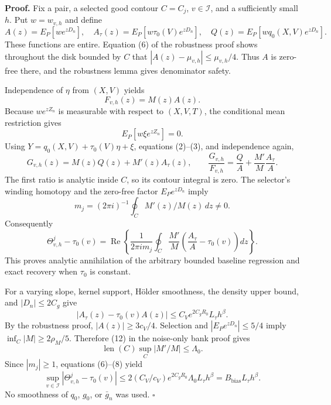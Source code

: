 \textbf{Proof.}
Fix a pair, a selected good contour \(C=C_j\), \(v\in\mathcal I\), and a sufficiently small \(h\). Put \(w=w_{v,h}\) and define
\[
 A(z)=E_P[we^{zD_n}],\quad
 A_\tau(z)=E_P[w\tau_0(V)e^{zD_n}],\quad
 Q(z)=E_P[wq_0(X,V)e^{zD_n}]. \tag{1}
\]
These functions are entire. Equation (6) of the robustness proof shows throughout the disk bounded by \(C\) that \(|A(z)-\mu_{v,h}|\le\mu_{v,h}/4\). Thus \(A\) is zero-free there, and the robustness lemma gives denominator safety.

Independence of \(\eta\) from \((X,V)\) yields
\[
 F_{v,h}(z)=M(z)A(z). \tag{2}
\]
Because \(we^{zZ_n}\) is measurable with respect to \((X,V,T)\), the conditional mean restriction gives
\[
 E_P[w\xi e^{zZ_n}]=0. \tag{3}
\]
Using \(Y=q_0(X,V)+\tau_0(V)\eta+\xi\), equations (2)--(3), and independence again,
\[
 G_{v,h}(z)=M(z)Q(z)+M'(z)A_\tau(z),\qquad
 \frac{G_{v,h}}{F_{v,h}}
 =\frac QA+\frac{M'}M\frac{A_\tau}{A}. \tag{4}
\]
The first ratio is analytic inside \(C\), so its contour integral is zero. The selector's winding homotopy and the zero-free factor \(E_Pe^{zD_n}\) imply
\[
 m_j=(2\pi i)^{-1}\oint_C M'(z)/M(z)\,dz\ne0. \tag{5}
\]
Consequently
\[
 \Theta^j_{v,h}-\tau_0(v)
 =\operatorname{Re}\left\{\frac{1}{2\pi i m_j}
 \oint_C\frac{M'}M
 \left(\frac{A_\tau}{A}-\tau_0(v)\right)dz\right\}. \tag{6}
\]
This proves analytic annihilation of the arbitrary bounded baseline regression and exact recovery when \(\tau_0\) is constant.

For a varying slope, kernel support, H\"older smoothness, the density upper bound, and \(|D_n|\le2C_g\) give
\[
 |A_\tau(z)-\tau_0(v)A(z)|
 \le C_Ve^{2C_gR_0}L_\tau h^\beta. \tag{7}
\]
By the robustness proof, \(|A(z)|\ge3c_V/4\). Selection and \(|E_Pe^{zD_n}|\le5/4\) imply \(\inf_C|M|\ge2\rho_M/5\). Therefore (12) in the noise-only bank proof gives
\[
 \operatorname{len}(C)\sup_C|M'/M|\le\Lambda_0. \tag{8}
\]
Since \(|m_j|\ge1\), equations (6)--(8) yield
\[
 \sup_{v\in\mathcal I}|\Theta^j_{v,h}-\tau_0(v)|
 \le 2(C_V/c_V)e^{2C_gR_0}\Lambda_0L_\tau h^\beta
 =B_{\mathrm{bias}}L_\tau h^\beta. \tag{9}
\]
No smoothness of \(q_0\), \(g_0\), or \(\bar g_n\) was used. \(\square\)